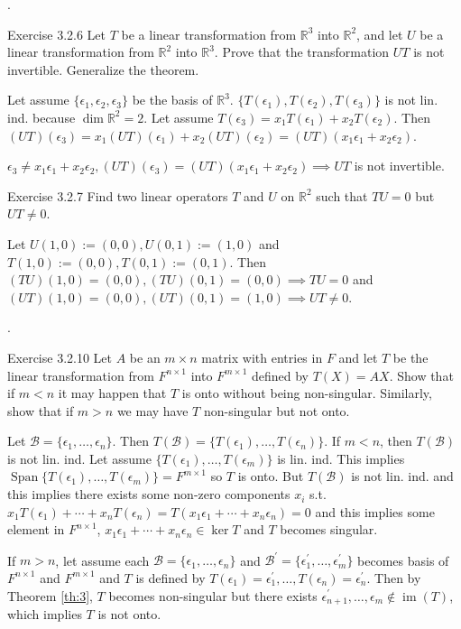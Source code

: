 \documentclass[8pt]{beamer}
\newcommand{\mbb}[1]{\mathbb{#1}}
\newcommand{\mc}[1]{\mathcal{#1}}
\newcommand{\Span}{\operatorname{Span}}
\newcommand{\im}{\operatorname{im}}
\begin{document}
\begin{frame}{.}
    \begin{block}{Exercise 3.2.6}
        Let $T$ be a linear transformation from $\mbb{R}^3$ into $\mbb{R}^2$, and let $U$ be a linear transformation from $\mbb{R}^2$ into $\mbb{R}^3$. Prove that the transformation $UT$ is not invertible. Generalize the theorem.
    \end{block}

    Let assume $\{\epsilon_1, \epsilon_2, \epsilon_3\}$ be the basis of $\mbb{R}^3$. $\{T(\epsilon_1), T(\epsilon_2), T(\epsilon_3)\}$ is not lin. ind. because $\dim \mbb{R}^2 = 2$. 
    Let assume $T(\epsilon_3) = x_1 T(\epsilon_1) + x_2 T(\epsilon_2)$. Then $(UT)(\epsilon_3) = x_1 (UT)(\epsilon_1) + x_2 (UT)(\epsilon_2) = (UT)(x_1 \epsilon_1 + x_2 \epsilon_2)$.

    $\epsilon_3 \neq x_1 \epsilon_1 + x_2 \epsilon_2, (UT)(\epsilon_3) = (UT)(x_1  \epsilon_1 + x_2 \epsilon_2) \implies UT$ is not invertible. 

    \begin{block}{Exercise 3.2.7}
        Find two linear operators $T$ and $U$ on $\mbb{R}^2$ such that $TU =0$ but $UT \neq 0$.
    \end{block}
    Let $U(1,0) := (0, 0), U(0,1) := (1, 0)$ and $T(1,0) := (0, 0), T(0, 1) := (0, 1)$. Then $(TU)(1, 0) = (0,0),(TU)(0, 1) = (0, 0) \implies TU = 0$ and $(UT)(1,0) = (0, 0), (UT) (0,1) = (1,0) \implies UT \neq 0$.
\end{frame}

\begin{frame}{.}
    \begin{block}{Exercise 3.2.10}
        Let $A$ be an $m \times n$ matrix with entries in $F$ and let $T$ be the linear transformation from $F^{n \times 1}$ into $F^{m \times 1}$ defined by $T(X) = AX$.
        Show that if $m < n$ it may happen that $T$ is onto without being non-singular.
        Similarly, show that if $m > n$ we may have $T$ non-singular but not onto.
    \end{block}
    Let $\mc{B} = \{\epsilon_1, \dots, \epsilon_n\}$.
    Then $T(\mc{B}) = \{T(\epsilon_1), \dots, T(\epsilon_n)\}$.
    If $m <n$, then $T(\mc{B})$ is not lin. ind. Let assume $\{T(\epsilon_1), \dots, T(\epsilon_m)\}$ is lin. ind. 
    This implies $\Span\{T(\epsilon_1), \dots, T(\epsilon_m)\} = F^{m \times 1}$ so $T$ is onto.
    But $T(\mc{B})$ is not lin. ind. and this implies there exists some non-zero components $x_i$ s.t. $x_1T(\epsilon_1) + \cdots + x_n T(\epsilon_n) =T(x_1 \epsilon_1 + \cdots + x_n\epsilon_n)= 0$ and this implies some element in $F^{n \times 1}$, $x_1 \epsilon_1 + \cdots + x_n \epsilon_n \in \ker T$ and $T$ becomes singular.

    If $m >n$, let assume each $\mc{B} = \{\epsilon_1, \dots, \epsilon_n\}$ and $\mc{B}^\prime = \{\epsilon_1^\prime, \dots, \epsilon_m^\prime\}$ becomes basis of $F^{n \times 1}$ and $F^{m \times 1}$ and $T$ is defined by $T(\epsilon_1) = \epsilon_1^\prime, \dots, T(\epsilon_n) = \epsilon_n^\prime$.
    Then by Theorem \ref{th:3}, $T$ becomes non-singular but there exists $\epsilon_{n+1}^\prime, \dots, \epsilon_m \notin \im (T)$, which implies $T$ is not onto.
\end{frame}
\end{document}
